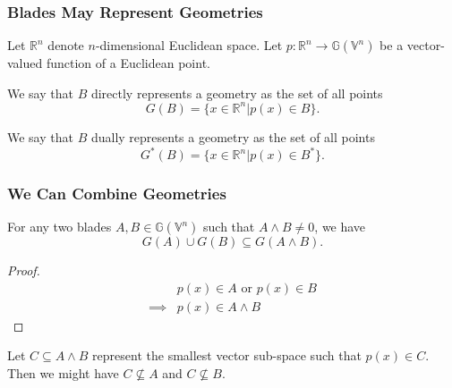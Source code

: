 \documentclass{beamer}
\newcommand{\G}{\mathbb{G}}
\newcommand{\V}{\mathbb{V}}
\newcommand{\R}{\mathbb{R}}
\begin{document}
\begin{frame}
\frametitle{Blades May Represent Geometries}
Let $\R^n$ denote $n$-dimensional Euclidean space.
Let $p:\R^n\to\G(\V^n)$ be a vector-valued function of a Euclidean point.
\begin{definition}
We say that $B$ \alert{directly} represents a geometry as the
set of all points
\begin{equation*}
G(B) = \{x\in\R^n|p(x)\in B\}.
\end{equation*}
\end{definition}
\begin{definition}
We say that $B$ \alert{dually} represents a geometry as the
set of all points
\begin{equation*}
G^*(B) = \{x\in\R^n|p(x)\in B^*\}.
\end{equation*}
\end{definition}
\end{frame}

\begin{frame}
\frametitle{We Can Combine Geometries}
For any two blades $A,B\in\G(\V^n)$ such that $A\wedge B\neq 0$, we have
\begin{equation*}
G(A)\cup G(B)\subseteq G(A\wedge B).
\end{equation*}
\begin{proof}
\begin{align*}
 & \mbox{$p(x)\in A$ or $p(x)\in B$} \\
\implies & \mbox{$p(x)\in A\wedge B$}
\end{align*}
\end{proof}
Let $C\subseteq A\wedge B$ represent the smallest vector sub-space such that $p(x)\in C$.
Then we might have $C\not\subseteq A$ and $C\not\subseteq B$.
\end{frame}
\end{document}
